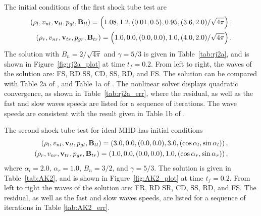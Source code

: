 The initial conditions of the first shock tube test are 
\begin{gather}
\begin{split}
\label{eqn:rj2a_init}
(\rho_l,v_{nl},\mathbf{v}_{tl},p_{gl},\mathbf{B}_{tl})= \left(1.08,1.2,(0.01,0.5),0.95,(3.6,2.0)/\sqrt{4\pi}\right), \\
(\rho_r,v_{nr},\mathbf{v}_{tr},p_{gr},\mathbf{B}_{tr}) = \left(1.0,0.0,(0.0,0.0),1.0,(4.0,2.0)/\sqrt{4\pi}\right).
\end{split}
\end{gather}
The solution with $B_n=2/\sqrt{4\pi}$ and $\gamma=5/3$ is given in Table~\ref{tab:rj2a}, and is shown in Figure~\ref{fig:rj2a_plot} at time $t_f=0.2$.  From left to right, the waves of the solution are: FS, RD SS, CD, SS, RD, and FS.  The solution can be compared with Table 2a of \citep{Ryu:1995a}, and Table 1a of \citep{Dai:1994a}.  The nonlinear solver displays quadratic convergence, as shown in Table~\ref{tab:rj2a_err}, where the residual, as well as the fast and slow waves speeds are listed for a sequence of iterations.  The wave speeds are consistent with the result given in Table 1b of \citep{Dai:1994a}.  

The second shock tube test for ideal MHD has initial conditions
\begin{gather}
\begin{split}
\label{eqn:AK2_init}
(\rho_l,v_{nl},\mathbf{v}_{tl},p_{gl},\mathbf{B}_{tl})= \left(3.0,0.0,(0.0,0.0),3.0,(\cos\alpha_l,\sin\alpha_l)\right), \\
(\rho_r,v_{nr},\mathbf{v}_{tr},p_{gr},\mathbf{B}_{tr}) = \left(1.0,0.0,(0.0,0.0),1.0,(\cos\alpha_r,\sin\alpha_r)\right),
\end{split}
\end{gather}
where $\alpha_l = 2.0$, $\alpha_r = 1.0$, $B_n = 3/2$, and $\gamma=5/3$.  The solution is given in Table~\ref{tab:AK2}, and is shown in Figure~\ref{fig:AK2_plot} at time $t_f=0.2$.  From left to right the waves of the solution are: FR, RD SR, CD, SS, RD, and FS.  The residual, as well as the fast and slow waves speeds, are listed for a sequence of iterations in Table \ref{tab:AK2_err}.  

